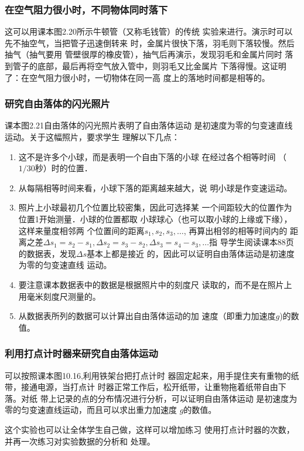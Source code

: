 \subsubsection{在空气阻力很小时，不同物体同时落下}
这可以用课本图2.20所示牛顿管（又称毛钱管）的传统
实验来进行。演示时可以先不抽空气，当把管子迅速倒转来
时，金属片很快下落，羽毛则下落较慢。然后抽气（抽气要用
管壁很厚的橡皮管），抽气后再演示，发现羽毛和金属片同时
落到管子的底部，最后再将空气放入管中，则羽毛又比金属片
下落得慢。这证明了：在空气阻力很小时，一切物体在同一高
度上的落地时间都是相等的。

\subsubsection{研究自由落体的闪光照片}
课本图2.21自由落体的闪光照片表明了自由落体运动
是初速度为零的匀变速直线运动。关于这幅照片，要求学生
理解以下几点：
\begin{enumerate}
\item 这不是许多个小球，而是表明一个自由下落的小球
在经过各个相等时间
（$1/30$秒）时的位置．
\item 从每隔相等时间来看，小球下落的距离越来越大，说
明小球是作变速运动。
\item 照片上小球最初几个位置比较密集，因此可选择某
一个间距较大的位置作为位置1开始测量．小球的位置都取
小球球心（也可以取小球的上缘或下缘），这样来量度相邻两
个位置间的距离$s_1,s_2,s_3,\ldots$, 再算出相邻的相等时间内的
距离之差$\Delta s_1=s_2-s_1,\Delta s_2=s_3-s_2,\Delta s_3=s_4-s_3,\ldots$指
导学生阅读课本88页的数据表，发现$\Delta s$基本上都是接近
的，因此可以证明自由落体运动是初速度为零的匀变速直线
运动。
\item 要注意课本数据表中的数据是根据照片中的刻度尺
读取的，而不是在照片上用毫米刻度尺测量的。
\item 从数据表所列的数据可以计算出自由落体运动的加
速度（即重力加速度$g$)的数值。
\end{enumerate}

\subsubsection{利用打点计时器来研究自由落体运动}
可以按照课本图10.16,利用铁架台把打点计时
器固定起来，用手提住夹有重物的纸带，接通电源，当打点计
时器正常工作后，松开纸带，让重物拖着纸带自由下落。对纸
带上记录的点的分布情况进行分析，可以证明自由落体运动
是初速度为零的匀变速直线运动，而且可以求出重力加速度
$g$的数值。

这个实验也可以让全体学生自己做，这样可以增加练习
使用打点计时器的次数，并再一次练习对实验数据的分析和
处理。


